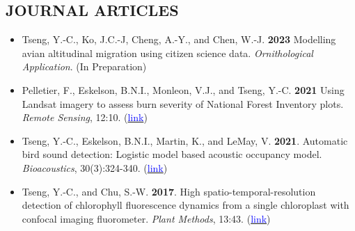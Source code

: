 \documentclass[11pt,letterpaper,sans]{moderncv}        %
\begin{document}
\subsection{JOURNAL ARTICLES}
\begin{itemize}

\item{Tseng, Y.-C., Ko, J.C.-J, Cheng, A.-Y., and Chen, W.-J. \textbf{2023} Modelling avian altitudinal migration using citizen science data. \textit{Ornithological Application}. (In Preparation)}
\vspace{3pt}

\item{Pelletier, F., Eskelson, B.N.I., Monleon, V.J., and Tseng, Y.-C. \textbf{2021} Using Landsat imagery to assess burn severity of National Forest Inventory plots. \textit{Remote Sensing}, 12:10. (\href{https://www.mdpi.com/2072-4292/13/10/1935}{\textcolor{blue}{link}})}
\vspace{3pt}

\item{Tseng, Y.-C., Eskelson, B.N.I., Martin, K., and LeMay, V. \textbf{2021}. Automatic bird sound detection: Logistic model based acoustic occupancy model. \textit{Bioacoustics}, 30(3):324-340. (\href{https://www.tandfonline.com/doi/abs/10.1080/09524622.2020.1730241}{\textcolor{blue}{link}})}
\vspace{3pt}

\item{Tseng, Y.-C., and Chu, S.-W. \textbf{2017}. High spatio-temporal-resolution detection of chlorophyll fluorescence dynamics from a single chloroplast with confocal imaging fluorometer. \textit{Plant Methods}, 13:43. (\href{https://doi.org/10.1186/s13007-017-0194-2}{\textcolor{blue}{link}})}

\end{itemize}

\end{document}
